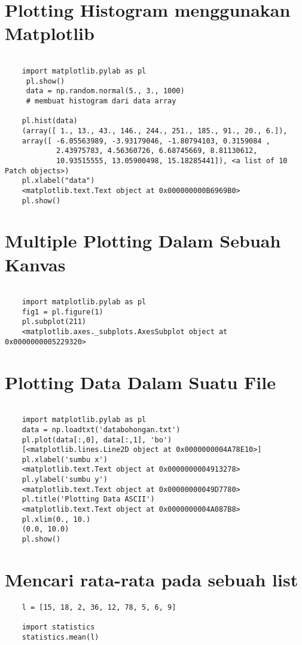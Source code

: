 \documentclass[12pt]{article} %
\begin{document}
\section {Plotting Histogram menggunakan Matplotlib}
\begin{lstlisting}
	
	import matplotlib.pylab as pl
	 pl.show()
	 data = np.random.normal(5., 3., 1000)
	 # membuat histogram dari data array

 	pl.hist(data)
	(array([ 1., 13., 43., 146., 244., 251., 185., 91., 20., 6.]),
	array([ -6.05563989, -3.93179046, -1.80794103, 0.3159084 ,
			2.43975783, 4.56360726, 6.68745669, 8.81130612,
			10.93515555, 13.05900498, 15.18285441]), <a list of 10 Patch objects>)
 	pl.xlabel("data")
	<matplotlib.text.Text object at 0x000000000B6969B0>
	pl.show()
\end{lstlisting}

\section {Multiple Plotting Dalam Sebuah Kanvas}
\begin{lstlisting}
	
	import matplotlib.pylab as pl
	fig1 = pl.figure(1)
	pl.subplot(211)
	<matplotlib.axes._subplots.AxesSubplot object at 0x0000000005229320>
\end{lstlisting}

\section {Plotting Data Dalam Suatu File}
\begin{lstlisting}
	
	import matplotlib.pylab as pl
	data = np.loadtxt('databohongan.txt')
	pl.plot(data[:,0], data[:,1], 'bo')
	[<matplotlib.lines.Line2D object at 0x0000000004A78E10>]
	pl.xlabel('sumbu x')
	<matplotlib.text.Text object at 0x0000000004913278>
	pl.ylabel('sumbu y')
	<matplotlib.text.Text object at 0x00000000049D7780>
	pl.title('Plotting Data ASCII')
	<matplotlib.text.Text object at 0x0000000004A087B8>
 	pl.xlim(0., 10.)
	(0.0, 10.0)
	pl.show()
\end{lstlisting}

\section {Mencari rata-rata pada sebuah list}
\begin{lstlisting}
	l = [15, 18, 2, 36, 12, 78, 5, 6, 9]
	
	import statistics
	statistics.mean(l)
\end{lstlisting}
\end{document}
